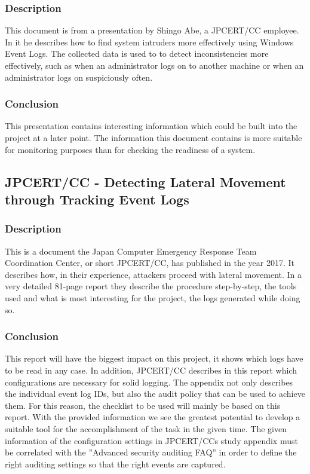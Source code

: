 \subsubsection{Description}
This document \cite{Abe2016} is from a presentation by Shingo Abe, a JPCERT/CC employee. In it he describes how to find system intruders more effectively using Windows Event Logs. The collected data is used to to detect inconsistencies more effectively, such as when an administrator logs on to another machine or when an administrator logs on suspiciously often. 
\subsubsection{Conclusion}
This presentation contains interesting information which could be built into the project at a later point. The information this document contains is more suitable for monitoring purposes than for checking the readiness of a system.

\subsection{JPCERT/CC - Detecting Lateral Movement through Tracking Event Logs}\label{JPCertStudy}
\subsubsection{Description}
This is a document \cite{JPCERTDetectingLateralMovement} the Japan Computer Emergency Response Team Coordination Center, or short JPCERT/CC, has published in the year 2017. It describes how, in their experience, attackers proceed with lateral movement. In a very detailed 81-page report they describe the procedure step-by-step, the tools used and what is most interesting for the project, the logs generated while doing so.
\subsubsection{Conclusion}
This report will have the biggest impact on this project, it shows which logs have to be read in any case. In addition, JPCERT/CC describes in this report which configurations are necessary for solid logging. The appendix not only describes the individual event log IDs, but also the audit policy that can be used to achieve them. For this reason, the checklist to be used will mainly be based on this report. With the provided information we see the greatest potential to develop a suitable tool for the accomplishment of the task in the given time. The given information of the configuration settings in JPCERT/CCs study appendix must be correlated with the ''Advanced security auditing FAQ'' \cite{AdvancedSecurityAuditing} in order to define the right auditing settings so that the right events are captured.


